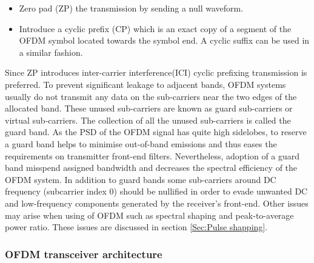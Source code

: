 \documentclass[12pt,a4paper,openright]{report}
\begin{document}
\begin{itemize}
\item Zero pad (ZP) the transmission by sending a null waveform.

\item Introduce a cyclic prefix (CP) which is an exact copy of a segment of the OFDM symbol located towards the symbol end. A cyclic suffix can be used in a similar fashion.

\end{itemize}
Since ZP introduces inter-carrier interference(ICI) cyclic prefixing transmission is preferred. 
To prevent significant leakage to adjacent bands, OFDM systems usually do not transmit any data on the sub-carriers near the two edges of the allocated band. These unused sub-carriers are known as guard sub-carriers or virtual sub-carriers. The collection of all the unused sub-carriers is called the guard band. As the PSD of the OFDM signal has quite high sidelobes, to reserve a guard band helps to minimise out-of-band emissions and thus eases the requirements on transmitter front-end filters. Nevertheless, adoption of a guard band misspend assigned bandwidth and decreases the spectral efficiency of the OFDM system. In addition to guard bands some sub-carriers around DC frequency (subcarrier index 0) should be nullified in order to evade unwanted DC and low-frequency components generated by the receiver's front-end. Other issues may arise when using of OFDM such as spectral shaping and peak-to-average power ratio. These issues are discussed in section \ref{Sec:Pulse shapping}. 


\subsubsection{OFDM transceiver architecture}
\end{document}
